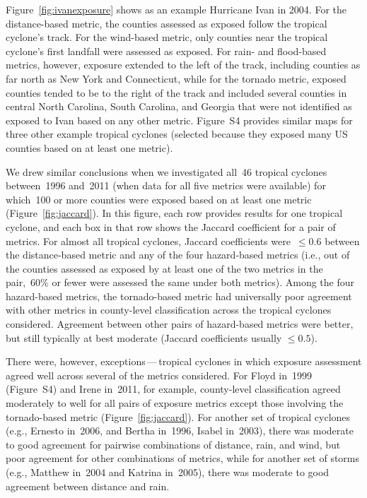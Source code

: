 Figure~\ref{fig:ivanexposure} shows as an example Hurricane Ivan in 2004.
For the distance-based metric, the counties assessed as exposed follow the
tropical cyclone's track. For the wind-based metric,
only counties near the tropical cyclone's first landfall were assessed as
exposed. For rain- and flood-based metrics, however, exposure extended to the
left of the track, including counties as far north as New York and Connecticut,
while for the tornado metric, exposed counties tended to be to the right of the
track and included several counties in central North Carolina, South Carolina,
and Georgia that were not identified as exposed to Ivan based on any other
metric. Figure~S4 provides similar maps for three other example tropical
cyclones (selected because they exposed many \ac{US}  counties based on at
least one metric).

We drew similar conclusions when we investigated all~46 tropical cyclones
between~1996 and~2011 (when data for all five metrics were available) for
which~100 or more counties were exposed based on at least one metric
(Figure~\ref{fig:jaccard}). In this figure, each row provides results for one
tropical cyclone, and each box in that row shows the Jaccard coefficient for a
pair of metrics.  For almost all tropical cyclones, Jaccard coefficients
were~$\le0.6$ between the distance-based metric and any of the four
hazard-based metrics (i.e., out of the counties assessed as exposed by at least
one of the two metrics in the pair,~60\si{\percent} or fewer were assessed the
same under both metrics). Among the four hazard-based metrics, the
tornado-based metric had universally poor agreement with other metrics in
county-level classification across the tropical cyclones considered.  Agreement
between other pairs of hazard-based metrics were better, but still typically at
best moderate (Jaccard coefficients usually $\le0.5$).

There were, however, exceptions\,---\,tropical cyclones in which exposure
assessment agreed well across several of the metrics considered.  For Floyd
in~1999 (Figure~S4) and Irene in~2011, for example, county-level classification
agreed moderately to well for all pairs of exposure metrics except those
involving the tornado-based metric (Figure~\ref{fig:jaccard}). For another set
of tropical cyclones (e.g., Ernesto in~2006, and Bertha in~1996, Isabel
in~2003), there was moderate to good agreement for pairwise combinations of
distance, rain, and wind, but poor agreement for other combinations of metrics,
while for another set of storms (e.g., Matthew in~2004 and Katrina in~2005),
there was moderate to good agreement between distance and rain.  



